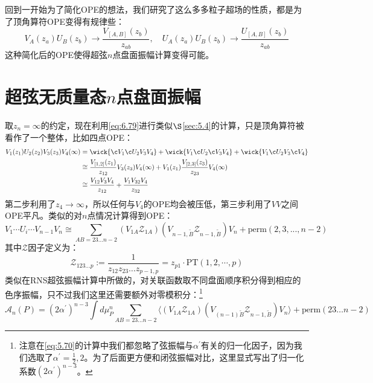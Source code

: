 回到一开始为了简化OPE的想法，我们研究了这么多多粒子超场的性质，都是为了顶角算符OPE变得有规律些：
\begin{equation}
	\label{eq:6.79}
	V_A(z_a)U_B(z_b)\to\frac{V_{[A,B]}(z_b)}{z_{ab}},\quad U_A(z_a)U_B(z_b)\to\frac{U_{[A,B]}(z_b)}{z_{ab}}
\end{equation}
这种简化后的OPE使得超弦$n$点盘面振幅计算变得可能。

\section{超弦无质量态$n$点盘面振幅}
取$z_n=\infty$的约定，现在利用\ref{eq:6.79}进行类似$\S$\ref{sec:5.4}的计算，只是顶角算符被看作了一个整体，比如四点OPE：
\begin{equation}
	\label{eq:6.80}
	\begin{aligned}
		V_1(z_1)U_2(z_2)V_3(z_3)V_4(\infty)&=\wick{\c V_1\c U_2V_3V_4}+\wick{ V_1\c U_2\c V_3V_4}+\wick{V_1\c U_2V_3\c V_4}\\
		&\cong\frac{V_{[1,2]}(z_1)}{z_{12}}V_3(z_3)V_4(\infty)+V_1(z_1)\frac{V_{[2,3]}(z_3)}{z_{23}}V_4(\infty)\\&\cong\frac{V_{12}V_3V_4}{z_{12}}+\frac{V_1V_{32}V_4}{z_{32}}
	\end{aligned}
\end{equation}
第二步利用了$z_4\to\infty$，所以任何与$V_4$的OPE均会被压低，第三步利用了$VV$之间OPE平凡。类似的对$n$点情况计算得到OPE：
\begin{equation}
	V_1\cdots U_i\cdots V_{n-1}V_n\cong\sum_{AB=23...n-2}(V_{1A}\mathcal{Z}_{1A})(V_{n-1,\tilde{B}}\mathcal{Z}_{n-1,\tilde{B}})V_n+\mathrm{perm}(2,3,...,n-2)
\end{equation}
其中$\mathcal{Z}$因子定义为：
\begin{equation}
	\label{PT}
	\mathcal{Z}_{123...p}:=\frac{1}{z_{12}z_{23}\ldots z_{p-1,p}}=z_{p1}\cdot\mathrm{PT}(1,2,\cdots,p)
\end{equation}
类似在RNS超弦振幅计算中所做的，对关联函数取不同盘面顺序积分得到相应的色序振幅，只不过我们这里还需要额外对零模积分：\footnote{注意在\ref{eq:5.70}的计算中我们都忽略了弦振幅与$\alpha^\prime$有关的归一化因子，因为我们选取了$\alpha^\prime=\frac12,2$。为了后面更方便和闭弦振幅对比，这里显式写出了归一化系数$(2\alpha^\prime)^{n-3}$。}
\begin{equation}
	\label{eq:6.85}
\boxed{
		\mathcal{A}_n(P)=(2\alpha^{\prime})^{n-3}\int d\mu_P^n\sum_{AB=23...n-2}\langle\left(V_{1A}\mathcal{Z}_{1A}\right)(V_{(n-1)\tilde{B}}\mathcal{Z}_{n-1,\tilde{B}})V_n\rangle+\mathrm{perm}(23\ldots n-2)
}
\end{equation}
